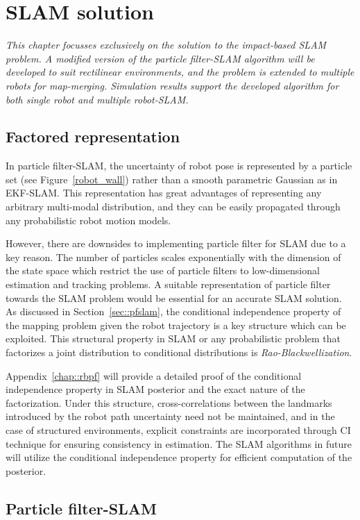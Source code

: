 \chapter{SLAM solution}  \label{chap::solution}
{\it \centering This chapter focusses exclusively on the solution to the impact-based SLAM problem. A modified version of the particle filter-SLAM algorithm will be developed to suit rectilinear environments, and the problem is extended to multiple robots for map-merging. Simulation results support the developed algorithm for both single robot and multiple robot-SLAM.}

\section{Factored representation} \label{sec::factpf}
In particle filter-SLAM, the uncertainty of robot pose is represented by a particle set (see Figure~\ref{robot_wall}) rather than a smooth parametric Gaussian as in EKF-SLAM. This representation has great advantages of representing any arbitrary multi-modal distribution, and they can be easily propagated through any probabilistic robot motion models.

However, there are downsides to implementing particle filter for SLAM due to a key reason. The number of particles scales exponentially with the dimension of the state space which restrict the use of particle filters to low-dimensional estimation and tracking problems. A suitable representation of particle filter towards the SLAM problem would be essential for an accurate SLAM solution. As discussed in Section~\ref{sec::pfslam}, the conditional independence property of the mapping problem given the robot trajectory is a key structure which can be exploited. This structural property in SLAM or any probabilistic problem that factorizes a joint distribution to conditional distributions is \textit{Rao-Blackwellization}.

Appendix~\ref{chap::rbpf} will provide a detailed proof of the conditional independence property in SLAM posterior and the exact nature of the factorization. Under this structure, cross-correlations between the landmarks introduced by the robot path uncertainty need not be maintained, and in the case of structured environments, explicit constraints are incorporated through \acs{CI} technique for ensuring consistency in estimation. The SLAM algorithms in future will utilize the conditional independence property for efficient computation of the posterior.

\section{Particle filter-SLAM}


